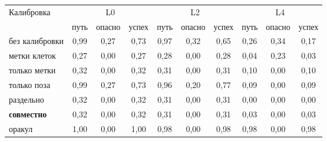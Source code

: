 \begin{tabular}{lccccccccc}
\toprule
Калибровка & \multicolumn{3}{c}{L0} & \multicolumn{3}{c}{L2} & \multicolumn{3}{c}{L4} \\
 & путь & опасно & успех & путь & опасно & успех & путь & опасно & успех \\
\midrule
без калибровки & 0{,}99 & 0{,}27 & 0{,}73 & 0{,}97 & 0{,}32 & 0{,}65 & 0{,}26 & 0{,}34 & 0{,}17 \\
метки клеток & 0{,}27 & 0{,}00 & 0{,}27 & 0{,}28 & 0{,}00 & 0{,}28 & 0{,}04 & 0{,}23 & 0{,}03 \\
только метки & 0{,}32 & 0{,}00 & 0{,}32 & 0{,}31 & 0{,}00 & 0{,}31 & 0{,}10 & 0{,}00 & 0{,}10 \\
только поза & 0{,}99 & 0{,}27 & 0{,}73 & 0{,}96 & 0{,}20 & 0{,}77 & 0{,}09 & 0{,}00 & 0{,}09 \\
раздельно & 0{,}32 & 0{,}00 & 0{,}32 & 0{,}31 & 0{,}00 & 0{,}31 & 0{,}00 & 0{,}00 & 0{,}00 \\
\textbf{совместно} & 0{,}32 & 0{,}00 & 0{,}32 & 0{,}31 & 0{,}00 & 0{,}31 & 0{,}03 & 0{,}00 & 0{,}03 \\
оракул & 1{,}00 & 0{,}00 & 1{,}00 & 0{,}98 & 0{,}00 & 0{,}98 & 0{,}98 & 0{,}00 & 0{,}98 \\
\bottomrule
\end{tabular}

